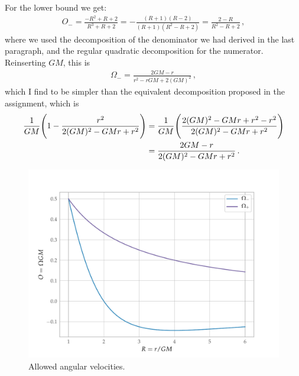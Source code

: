 \documentclass[main.tex]{subfiles}
\begin{document}
For the lower bound we get: 
%
\begin{align}
O_{- } = \frac{- R^2 + R + 2 }{R^3 + R + 2} 
= - \frac{(R+1) (R-2)}{(R+1) (R^2-R+2)} 
= \frac{2-R}{R^2-R+2}
\,,
\end{align}
%
where we used the decomposition of the denominator we had derived in the last paragraph, and the regular quadratic decomposition for the numerator. Reinserting \(GM\), this is 
%
\begin{align}
\Omega_{-} = \frac{2GM-r}{r^2- rGM +2 (GM)^2}
\,,
\end{align}
%
which I find to be simpler than the equivalent decomposition proposed in the assignment, which is 
%
\begin{align}
\frac{1}{GM} \qty(1 - \frac{r^2}{2(GM)^2-GMr +r^2}) 
&= \frac{1}{GM} \qty(\frac{2(GM)^2-GMr +r^2 - r^2}{2(GM)^2-GMr +r^2})  \\
&= \frac{2GM - r}{2(GM)^2-GMr +r^2}
\,.
\end{align}
%
\begin{figure}[ht]
  \centering
  \includegraphics[width=\textwidth]{figures/allowed_velocities.pdf}
  \caption{Allowed angular velocities.}
  \label{fig:allowed-velocities}
\end{figure}
%
\end{document}
